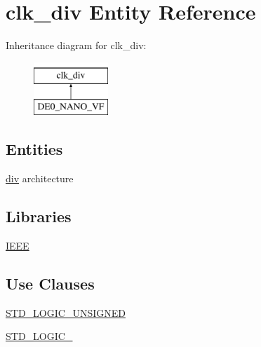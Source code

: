 \hypertarget{classclk__div}{}\section{clk\+\_\+div Entity Reference}
\label{classclk__div}
Inheritance diagram for clk\+\_\+div\+:\begin{figure}[H]
\begin{center}
\leavevmode
\includegraphics[height=2.000000cm]{classclk__div}
\end{center}
\end{figure}
\subsection*{Entities}
\begin{DoxyCompactItemize}
\item 
\hyperlink{classclk__div_1_1div}{div} architecture
\end{DoxyCompactItemize}
\subsection*{Libraries}
 \begin{DoxyCompactItemize}
\item 
\hyperlink{classclk__div_ae4f03c286607f3181e16b9aa12d0c6d4}{I\+E\+E\+E} 
\end{DoxyCompactItemize}
\subsection*{Use Clauses}
 \begin{DoxyCompactItemize}
\item 
\hyperlink{classclk__div_a241c3e72dd8024cc8ae831b1b2aed7db}{S\+T\+D\+\_\+\+L\+O\+G\+I\+C\+\_\+\+U\+N\+S\+I\+G\+N\+E\+D}   
\item 
\hyperlink{classclk__div_aa4b2b25246a821511120e3149b003563}{S\+T\+D\+\_\+\+L\+O\+G\+I\+C\+\_}   
\end{DoxyCompactItemize}
